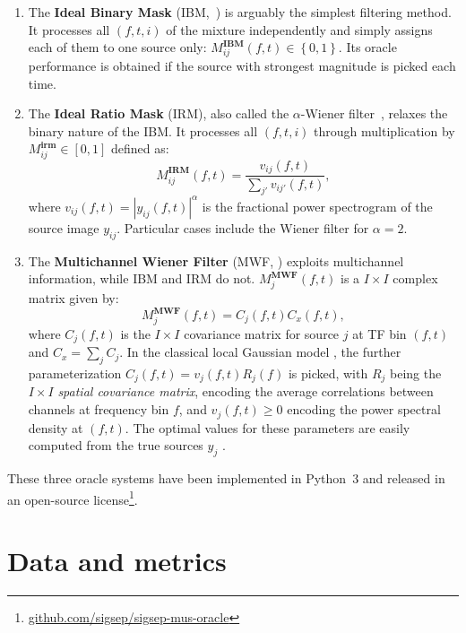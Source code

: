 \documentclass{llncs}
\newcommand{\sboxed}[1]{\textbf{#1}}
\newcommand{\ft}{\left(f,t\right)}
\begin{document}
\begin{enumerate}
  \item The \textbf{Ideal Binary Mask} (IBM,~\cite{wang2005}) is arguably the simplest filtering method. It processes all $\left(f,t,i\right)$ of the mixture independently and simply assigns each of them to one source only:   $M_{ij}^\sboxed{IBM}\ft\in\left\{0,1\right\}$. Its oracle performance is obtained if the source with strongest magnitude is picked each time.
  \item The \textbf{Ideal Ratio Mask} (IRM), also called the $\alpha$-Wiener filter~\cite{liutkus15}, relaxes the binary nature of the IBM. It processes all $\left(f,t,i\right)$ through multiplication by $M_{ij}^\sboxed{irm}\in\left[0,1\right]$ defined as:
  \begin{equation}
    M^{\sboxed{IRM}}_{ij}\ft=\frac{v_{ij}\ft}{\sum_{j'}v_{ij'}\ft},
  \end{equation}
where $v_{ij}\ft=\left|y_{ij}\ft\right|^\alpha$ is the fractional power spectrogram of the source image $y_{ij}$. Particular cases include the Wiener filter for $\alpha=2$.
  \item The \textbf{Multichannel Wiener Filter} (MWF, \cite{duong10}) exploits multichannel information, while IBM and IRM do not. $M^{\sboxed{MWF}}_{j}\ft$ is a $I\times I$ complex matrix given by:
  \begin{equation}
    M_{j}^{\sboxed{MWF}}\ft=C_{j}\ft C_{x}\ft,
  \end{equation}
where $C_j\ft$ is the $I\times I$ covariance matrix for source $j$ at TF bin $\ft$ and $C_x=\sum_j C_j$. In the classical local Gaussian model \cite{duong10}, the further parameterization $C_j\ft=v_j\ft R_j\left(f\right)$ is picked, with $R_j$ being the $I\times I$ \textit{spatial covariance matrix}, encoding the average correlations between channels at frequency bin $f$, and $v_j\ft\geq0$ encoding the power spectral density at $\ft$. The optimal values for these parameters are easily computed from the true sources $y_j$ \cite{liutkus2013}.
\end{enumerate}

These three oracle systems have been implemented in Python~3 and released in an open-source license\footnote{\url{github.com/sigsep/sigsep-mus-oracle}}.

\section{Data and metrics}
\end{document}
